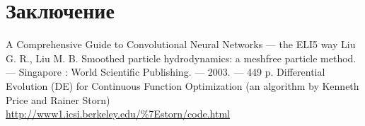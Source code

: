 \documentclass[12pt]{article}
\begin{document}
    



\section{Заключение}

\newpage
{}
\begin{thebibliography}{}
    A Comprehensive Guide to Convolutional Neural Networks — the ELI5 way
    Liu G. R., Liu M. B. Smoothed particle hydrodynamics: a meshfree particle method. --- Singapore : World Scientific Publishing. --- 2003. --- 449 p.
    Differential Evolution (DE) for Continuous Function Optimization (an algorithm by Kenneth Price and Rainer Storn) \\
    \url{http://www1.icsi.berkeley.edu/\%7Estorn/code.html}

\end{thebibliography}
\end{document}
